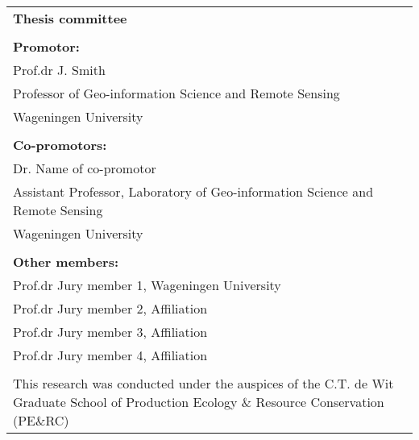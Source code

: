 \begin{flushleft}
\begin{tabular}{@{}p{\textwidth}}
    \textbf{Thesis committee}                                                                 \\  
                                                                                              \\  
    \textbf{Promotor:}                                                                        \\  
    Prof.dr J. Smith                                                                          \\  
    Professor of Geo-information Science and Remote Sensing                                   \\  
    Wageningen University                                                                     \\  
                                                                                              \\  
    \textbf{Co-promotors:}                                                                    \\  
    Dr. Name of co-promotor                                                                   \\  
    Assistant Professor, Laboratory of Geo-information Science and Remote Sensing             \\  
    Wageningen University                                                                     \\  
                                                                                              \\  

    \textbf{Other members:}                                                                   \\  
    Prof.dr Jury member 1, Wageningen University                                              \\  
    Prof.dr Jury member 2, Affiliation                                                        \\  
    Prof.dr Jury member 3, Affiliation                                                        \\  
    Prof.dr Jury member 4, Affiliation                                                        \\  
                                                                                              \\  
    \small{This research was conducted under the auspices of the C.T. de Wit Graduate School
    of Production Ecology \& Resource Conservation (PE$\&$RC)}                                  
\end{tabular}
\end{flushleft}

